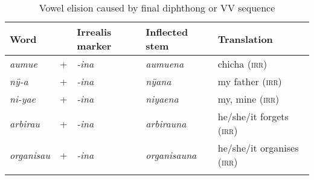 \begin{table}
\caption{Vowel elision caused by final diphthong or VV sequence}

\begin{tabularx}{\textwidth}{lXlll}
\lsptoprule
 Word & & Irrealis marker & Inflected stem & Translation\\
\midrule
	\textit{aumue} & + &\textit{-ina} & \textit{aumuena} & chicha (\textsc{irr})\\
	\textit{nÿ-a}  & + & \textit{-ina} &  \textit{nÿana} & my father (\textsc{irr})\\
	\textit{ni-yae}  & + & \textit{-ina} &  \textit{niyaena} & my, mine (\textsc{irr}) \\
	\textit{arbirau} & + & \textit{-ina} &  \textit{arbirauna} & he/she/it forgets (\textsc{irr})\\
	\textit{organisau} & + & \textit{-ina} & \textit{organisauna} & he/she/it organises (\textsc{irr})\\
\lspbottomrule
\end{tabularx}

\label{table:elision-ina}
\end{table}

